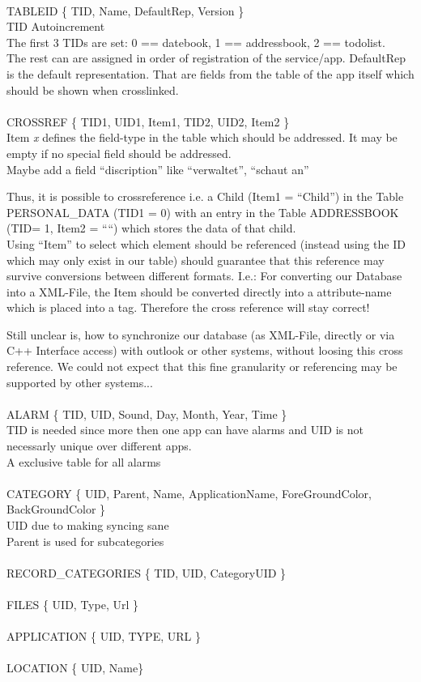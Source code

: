 \\ 
\noindent
TABLEID \{ TID, Name, DefaultRep, Version \}  \\
TID Autoincrement \\
The first 3 TIDs are set: 0 == datebook, 1 == addressbook, 2 == todolist.\\
The rest can are assigned in order of registration of the service/app.
DefaultRep is the default representation. That are fields from the table of the app itself which should be shown when crosslinked. \\
\\
\noindent
CROSSREF \{ TID1, UID1, Item1, TID2, UID2, Item2 \}\\
Item \emph{x} defines the field-type in the table which should be addressed. It may be empty if no special field should be addressed. \\
Maybe add a field ``discription'' like ``verwaltet'', ``schaut an''

\noindent
Thus, it is possible to crossreference i.e. a Child (Item1 = ``Child'') in the Table PERSONAL\_DATA (TID1 = 0) with an entry in the Table ADDRESSBOOK (TID= 1, Item2 = ````) which stores the data of that child.\\

\noindent
Using ``Item'' to select which element should be referenced (instead using the ID which may only exist in our table) should guarantee that this reference may survive conversions between different formats. I.e.: For converting our Database into a XML-File, the Item should be converted directly into a attribute-name which is placed into a tag. Therefore the cross reference will stay correct!

\noindent
Still unclear is, how to synchronize our database (as XML-File, directly or via C++ Interface access) with outlook or other systems, without loosing this cross reference. We could not expect that this fine granularity or referencing may be supported by other systems...\\
\\
\noindent
ALARM \{ TID, UID, Sound, Day, Month, Year, Time \}\\
TID is needed since more then one app can have alarms and UID is not necessarly unique over different apps. \\
A exclusive table for all alarms\\
\\
\noindent
CATEGORY \{ UID, Parent, Name, ApplicationName, ForeGroundColor, BackGroundColor \}\\
UID due to making syncing sane\\
Parent is used for subcategories \\
\\
\noindent
RECORD\_CATEGORIES \{ TID, UID, CategoryUID \}\\
\\
\noindent
FILES \{ UID, Type, Url \}\\ 
\\
\noindent
APPLICATION \{ UID, TYPE, URL \}\\ 
\\
\noindent
LOCATION \{ UID, Name\}\\



